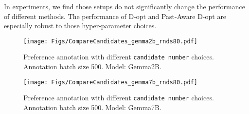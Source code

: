 In experiments, we find those setups do not significantly change the performance of different methods. The performance of D-opt and Past-Aware D-opt are especially robust to those hyper-parameter choices.


\begin{figure}[h!]
    \centering
    \texttt{[image: Figs/CompareCandidates\_gemma2b\_rnds80.pdf]}
    \caption{\small Preference annotation with different \texttt{candidate number} choices. Annotation batch size 500. Model: Gemma2B.}
    \label{fig:results_candidate_abs500_gemma2b} 
\end{figure}

\begin{figure}[h!]
    \centering
    \texttt{[image: Figs/CompareCandidates\_gemma7b\_rnds80.pdf]}
    \caption{\small Preference annotation with different \texttt{candidate number} choices. Annotation batch size 500. Model: Gemma7B.}
    \label{fig:results_candidate_abs500_gemma7b} 
\end{figure}



